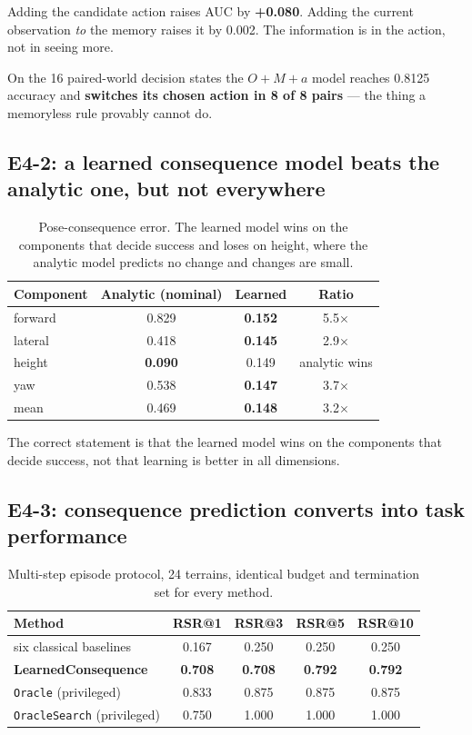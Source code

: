 \documentclass[utf8]{FrontiersinHarvard}
\begin{document}
Adding the candidate action raises AUC by \textbf{+0.080}. Adding the current
observation \emph{to} the memory raises it by 0.002. The information is in the action,
not in seeing more.

On the 16 paired-world decision states the $O{+}M{+}a$ model reaches 0.8125 accuracy and
\textbf{switches its chosen action in 8 of 8 pairs} --- the thing a memoryless rule
provably cannot do.

\subsection{E4-2: a learned consequence model beats the analytic one, but not everywhere}

\begin{table}[h]
\caption{Pose-consequence error. The learned model wins on the components that decide
success and loses on height, where the analytic model predicts no change and changes are
small.}
\label{tab:pose}
\begin{tabular}{lccc}
\toprule
Component & Analytic (nominal) & Learned & Ratio \\
\midrule
forward & 0.829 & \textbf{0.152} & 5.5$\times$ \\
lateral & 0.418 & \textbf{0.145} & 2.9$\times$ \\
height & \textbf{0.090} & 0.149 & analytic wins \\
yaw & 0.538 & \textbf{0.147} & 3.7$\times$ \\
mean & 0.469 & \textbf{0.148} & 3.2$\times$ \\
\bottomrule
\end{tabular}
\end{table}

The correct statement is that the learned model wins on the components that decide
success, not that learning is better in all dimensions.

\subsection{E4-3: consequence prediction converts into task performance}

\begin{table}[h]
\caption{Multi-step episode protocol, 24 terrains, identical budget and termination set
for every method.}
\label{tab:main}
\begin{tabular}{lcccc}
\toprule
Method & RSR@1 & RSR@3 & RSR@5 & RSR@10 \\
\midrule
six classical baselines & 0.167 & 0.250 & 0.250 & 0.250 \\
\textbf{LearnedConsequence} & \textbf{0.708} & \textbf{0.708} & \textbf{0.792} & \textbf{0.792} \\
\texttt{Oracle} (privileged) & 0.833 & 0.875 & 0.875 & 0.875 \\
\texttt{OracleSearch} (privileged) & 0.750 & 1.000 & 1.000 & 1.000 \\
\bottomrule
\end{tabular}
\end{table}
\end{document}
